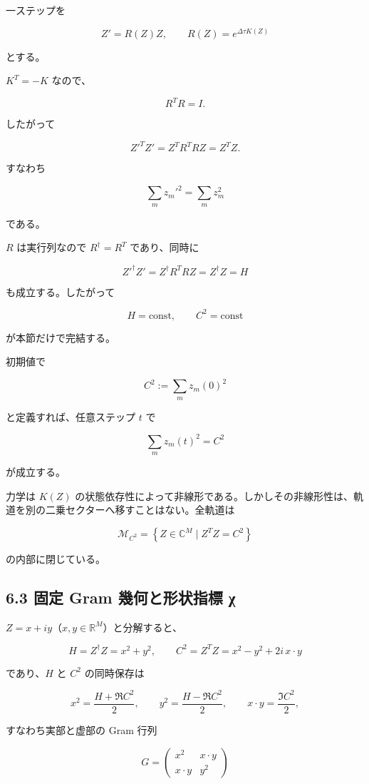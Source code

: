 \documentclass[
  a4paper,
]{ltjsarticle}
\begin{document}
一ステップを

\[
Z'=R(Z)Z,
\qquad
R(Z)=e^{\Delta\tau K(Z)}
\]

とする。

\(K^T=-K\) なので、

\[
R^TR=I.
\]

したがって

\[
Z'^T Z'
=
Z^T R^T R Z
=
Z^T Z.
\]

すなわち

\[
\boxed{
\sum_m z_m'^2
=
\sum_m z_m^2
}
\]

である。

\(R\) は実行列なので \(R^\dagger=R^T\) であり、同時に

\[
\boxed{
Z'^\dagger Z'
=
Z^\dagger R^TRZ
=
Z^\dagger Z
=
H
}
\]

も成立する。したがって

\[
\boxed{H=\text{const},\qquad C^2=\text{const}}
\]

が本節だけで完結する。

初期値で

\[
C^2:=\sum_m z_m(0)^2
\]

と定義すれば、任意ステップ \(t\) で

\[
\boxed{
\sum_m z_m(t)^2=C^2
}
\]

が成立する。

力学は \(K(Z)\)
の状態依存性によって非線形である。しかしその非線形性は、軌道を別の二乗セクターへ移すことはない。全軌道は

\[
\mathcal M_{C^2}
=
\left\{
Z\in\mathbb C^M
\mid
Z^T Z=C^2
\right\}
\]

の内部に閉じている。

\subsection{6.3 固定 Gram 幾何と形状指標
χ}\label{ux56faux5b9a-gram-ux5e7eux4f55ux3068ux5f62ux72b6ux6307ux6a19-ux3c7}

\(Z=x+iy\)（\(x,y\in\mathbb R^M\)）と分解すると、

\[
H=Z^\dagger Z=x^2+y^2,
\qquad
C^2=Z^TZ=x^2-y^2+2i\,x\cdot y
\]

であり、\(H\) と \(C^2\) の同時保存は

\[
x^2=\frac{H+\Re C^2}{2},
\qquad
y^2=\frac{H-\Re C^2}{2},
\qquad
x\cdot y=\frac{\Im C^2}{2},
\]

すなわち実部と虚部の Gram 行列

\[
G=
\begin{pmatrix}
x^2 & x\cdot y\\
x\cdot y & y^2
\end{pmatrix}
\]
\end{document}

